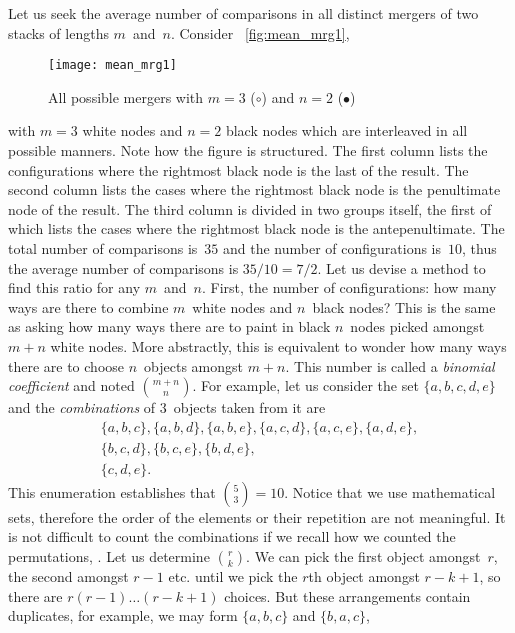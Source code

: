 Let us seek the average number of comparisons in all distinct mergers
of two stacks of lengths \(m\)~and~\(n\). Consider
\fig~\vref{fig:mean_mrg1},
\begin{figure}[b]
\centering
\texttt{[image: mean\_mrg1]}
\caption{All possible mergers with \(m=3\) (\(\circ\)) and \(n=2\)
  (\(\bullet\))}
\label{fig:mean_mrg1}
\end{figure}
with \(m=3\) white nodes and \(n=2\) black nodes which are interleaved
in all possible manners. Note how the figure is structured. The first
column lists the configurations where the rightmost black node is the
last of the result. The second column lists the cases where the
rightmost black node is the penultimate node of the result. The third
column is divided in two groups itself, the first of which lists the
cases where the rightmost black node is the antepenultimate. The total
number of comparisons is~\(35\) and the number of configurations
is~\(10\), thus the average number of comparisons is \(35/10 =
7/2\).\label{seven_two} Let us devise a method to find this ratio for
any \(m\)~and~\(n\). First, the number of configurations: how many
ways are there to combine \(m\)~white nodes and \(n\)~black nodes?
This is the same as asking how many ways there are to paint in black
\(n\)~nodes picked amongst \(m+n\) white nodes. More abstractly, this
is equivalent to wonder how many ways there are to choose
\(n\)~objects amongst \(m+n\). This number is called a \emph{binomial
  coefficient} and noted
\(\binom{m+n}{n}\). For example, let us consider the set
\(\{a,b,c,d,e\}\) and the \emph{combinations} of
\(3\)~objects taken from it are
\begin{gather*}
\{a,b,c\},\{a,b,d\},\{a,b,e\},\{a,c,d\},\{a,c,e\},\{a,d,e\},\\
\{b,c,d\},\{b,c,e\},\{b,d,e\},\\
\{c,d,e\}.
\end{gather*}
This enumeration establishes that \(\binom{5}{3} = 10\). Notice that
we use mathematical sets, therefore the order of the elements or their
repetition are not meaningful. It is not difficult to count the
combinations if we recall how we counted the permutations,
. Let us determine \(\binom{r}{k}\). We can
pick the first object amongst~\(r\), the second amongst \(r-1\)
etc. until we pick the \(r\)th object amongst \(r-k+1\), so there are
\(r(r-1)\dots(r-k+1)\) choices. But these arrangements contain
duplicates, for example, we may form \(\{a,b,c\}\) and \(\{b,a,c\}\),
